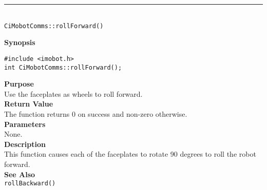 \noindent
\vspace{5pt}
\rule{4.5in}{0.015in}\\
\noindent
{\LARGE \texttt{CiMobotComms::rollForward()}}\\
{}

\noindent
{\bf Synopsis}\\
\begin{verbatim}
#include <imobot.h>
int CiMobotComms::rollForward();
\end{verbatim}

\noindent
{\bf Purpose}\\
Use the faceplates as wheels to roll forward.\\

\noindent
{\bf Return Value}\\
The function returns 0 on success and non-zero otherwise.\\

\noindent
{\bf Parameters}\\
None.\\

\noindent
{\bf Description}\\
This function causes each of the faceplates to rotate 90 degrees to roll the
robot forward.\\

\noindent
{\bf See Also}\\
\texttt{rollBackward()}

